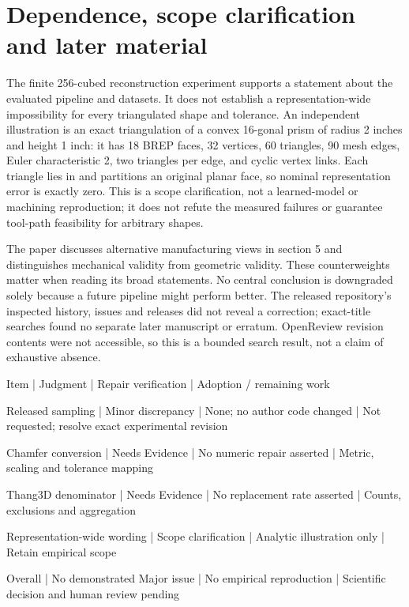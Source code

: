 \documentclass[10pt]{article}
\begin{document}
\section*{Dependence, scope clarification and later material}
The finite 256-cubed reconstruction experiment supports a statement about the evaluated pipeline and datasets. It does not establish a representation-wide impossibility for every triangulated shape and tolerance. An independent illustration is an exact triangulation of a convex 16-gonal prism of radius 2 inches and height 1 inch: it has 18 BREP faces, 32 vertices, 60 triangles, 90 mesh edges, Euler characteristic 2, two triangles per edge, and cyclic vertex links. Each triangle lies in and partitions an original planar face, so nominal representation error is exactly zero. This is a scope clarification, not a learned-model or machining reproduction; it does not refute the measured failures or guarantee tool-path feasibility for arbitrary shapes.\par
The paper discusses alternative manufacturing views in section 5 and distinguishes mechanical validity from geometric validity. These counterweights matter when reading its broad statements. No central conclusion is downgraded solely because a future pipeline might perform better. The released repository’s inspected history, issues and releases did not reveal a correction; exact-title searches found no separate later manuscript or erratum. OpenReview revision contents were not accessible, so this is a bounded search result, not a claim of exhaustive absence.\par
Item | Judgment | Repair verification | Adoption / remaining work\par
Released sampling | Minor discrepancy | None; no author code changed | Not requested; resolve exact experimental revision\par
Chamfer conversion | Needs Evidence | No numeric repair asserted | Metric, scaling and tolerance mapping\par
Thang3D denominator | Needs Evidence | No replacement rate asserted | Counts, exclusions and aggregation\par
Representation-wide wording | Scope clarification | Analytic illustration only | Retain empirical scope\par
Overall | No demonstrated Major issue | No empirical reproduction | Scientific decision and human review pending\par
\end{document}
